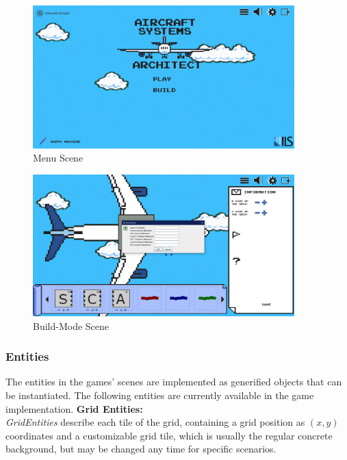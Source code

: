 \begin{figure}
    \centering
        \includegraphics[width=0.9\textwidth]{Pictures/res/implementation/scenes/main-menu}
    \caption{Menu Scene}
    \label{fig:menu-scene}
\end{figure}

\begin{figure}
    \centering
    \includegraphics[width=0.9\textwidth]{Pictures/res/implementation/scenes/build-mode}
    \caption{Build-Mode Scene}
    \label{fig:build-mode}
\end{figure}

\subsubsection{Entities}\label{subsubsec:entities2}
The entities in the games' scenes are implemented as generified objects that can be instantiated.
The following entities are currently available in the game implementation.
\textbf{Grid Entities:} \\
\textit{GridEntities} describe each tile of the grid, containing a grid position as $(x,y)$ coordinates and a customizable grid tile,
which is usually the regular concrete background, but may be changed any time for specific scenarios.

